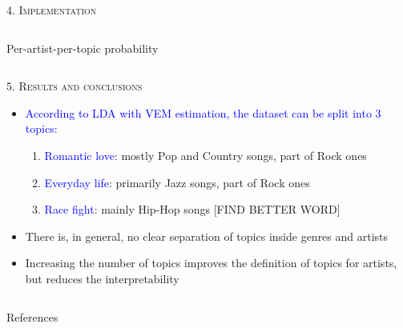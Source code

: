 \documentclass[fleqn,final]{beamer}
\begin{document}
\begin{frame}
\begin{columns}[t]
\begin{column}{.46\linewidth}
\begin{block}{\rule[-2.5mm]{0cm}{1cm}\textsc{4. Implementation}}
\begin{column}{.98\linewidth}
\begin{block}{\small{Per-artist-per-topic probability}}
		
\end{block}
\end{column}
\end{block}	 	
\vspace{-1cm}







	 	
\begin{block}{\rule[-2.5mm]{0cm}{1cm}\textsc{5. Results and conclusions}}

\begin{itemize}
\item \textcolor{blue}{According to LDA with VEM estimation, the dataset can be split into 3 topics:}
    \begin{enumerate}
        \item \textcolor{blue}{Romantic love}: mostly Pop and Country songs, part of Rock ones
        \item \textcolor{blue}{Everyday life}: primarily Jazz songs, part of Rock ones 
        \item \textcolor{blue}{Race fight}: mainly Hip-Hop songs [FIND BETTER WORD]
    \end{enumerate}
\item There is, in general, no clear separation of topics inside genres and artists
\item Increasing the number of topics improves the definition of topics for artists, but reduces the interpretability

\end{itemize}





		\end{block}	 	
			
 \end{column}
\end{columns}



\vspace{-1cm}
   \begin{block}{References}
   \vspace{-0.3cm}


\end{block}
\end{frame}
\end{document}

